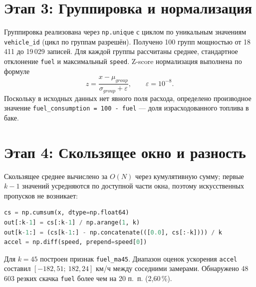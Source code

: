 \documentclass[oneside,a4paper,14pt]{extarticle}
\begin{document}
\section*{Этап 3: Группировка и нормализация}
Группировка реализована через \texttt{np.unique} с циклом по уникальным значениям \texttt{vehicle\_id} (цикл по группам разрешён). Получено 100 групп мощностью от 18\,411 до 19\,029 записей. Для каждой группы рассчитаны среднее, стандартное отклонение \texttt{fuel} и максимальный \texttt{speed}. Z-score нормализация выполнена по формуле
\begin{equation}
	z = \frac{x - \mu_{group}}{\sigma_{group} + \varepsilon}, \qquad \varepsilon = 10^{-8}.
	\label{eq:zscore}
\end{equation}
Поскольку в исходных данных нет явного поля расхода, определено производное значение \texttt{fuel\_consumption = 100 - fuel} --- доля израсходованного топлива в баке.

\section*{Этап 4: Скользящее окно и разность}
Скользящее среднее вычислено за $O(N)$ через кумулятивную сумму; первые $k-1$ значений усредняются по доступной части окна, поэтому искусственных пропусков не возникает:
\begin{lstlisting}[language=Python]
cs = np.cumsum(x, dtype=np.float64)
out[:k-1] = cs[:k-1] / np.arange(1, k)
out[k-1:] = (cs[k-1:] - np.concatenate(([0.0], cs[:-k]))) / k
accel = np.diff(speed, prepend=speed[0])
\end{lstlisting}
Для $k=45$ построен признак \texttt{fuel\_ma45}. Диапазон оценок ускорения \texttt{accel} составил $[-182{,}51;\ 182{,}24]$ км/ч между соседними замерами. Обнаружено 48\,603 резких скачка \texttt{fuel} более чем на 20 п.~п. (2,60\,\%).
\end{document}
